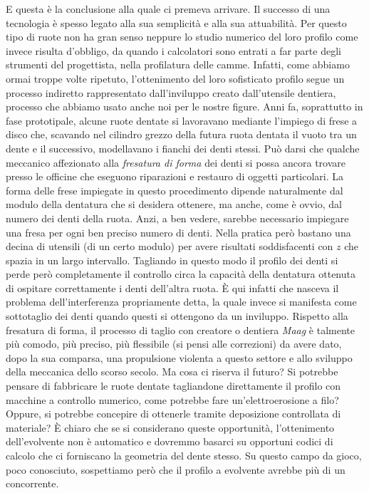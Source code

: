\noindent E questa \`e
la conclusione alla quale ci premeva arrivare. Il successo di una 
tecnologia \`e spesso legato alla sua semplicit\`a e
alla sua attuabilit\`a.
Per questo tipo di  ruote non ha gran senso neppure lo studio numerico
del loro profilo come invece risulta d'obbligo,
da quando i calcolatori sono entrati a far parte degli strumenti
del progettista,  nella profilatura 
delle camme. Infatti, come abbiamo ormai troppe volte ripetuto,
l'ottenimento del loro sofisticato profilo
segue un processo
indiretto rappresentato dall'inviluppo creato dall'utensile dentiera,
processo che abbiamo usato anche noi per le nostre figure.
Anni fa, soprattutto
in fase prototipale, alcune
ruote dentate si lavoravano mediante l'impiego di frese a disco
che, scavando nel cilindro grezzo della futura ruota dentata
il vuoto tra un dente e il successivo,
modellavano i fianchi dei denti stessi.
Pu\`o darsi che qualche meccanico affezionato
alla {\em fresatura di forma}
dei denti si possa ancora trovare presso
le officine che eseguono riparazioni e restauro di oggetti particolari.
La forma delle frese impiegate in questo procedimento
dipende naturalmente dal modulo della dentatura che si desidera ottenere,
ma anche, come \`e ovvio, dal numero dei denti della ruota.
Anzi, a ben vedere, sarebbe necessario impiegare 
una fresa per ogni ben preciso numero di denti.
Nella pratica per\`o bastano una decina di
utensili (di un certo modulo) per avere risultati soddisfacenti con
$z$ che spazia in un largo intervallo. Tagliando in
questo modo  il profilo dei denti
si perde per\`o completamente il controllo circa la 
capacit\`a della dentatura ottenuta di ospitare correttamente i denti
dell'altra ruota. \`E qui infatti che nasceva il problema dell'interferenza
propriamente detta,
la quale invece si manifesta come sottotaglio
dei denti quando questi si ottengono da un inviluppo. Rispetto alla
fresatura di forma,
il processo di taglio con creatore o dentiera {\em Maag} \`e
talmente pi\`u comodo, pi\`u preciso, pi\`u flessibile (si pensi
alle correzioni) da avere dato, dopo la sua comparsa,
una propulsione violenta a questo settore e allo sviluppo
della meccanica dello scorso secolo. Ma
cosa ci riserva il futuro? Si potrebbe pensare di fabbricare le ruote
dentate tagliandone direttamente il profilo con macchine
a controllo numerico, come potrebbe fare un'elettroerosione a filo?
Oppure, si potrebbe concepire di ottenerle tramite deposizione controllata
di materiale?  \`E chiaro che se si considerano queste opportunit\`a,
l'ottenimento dell'evolvente non \`e automatico e dovremmo
basarci su opportuni codici di calcolo che ci forniscano la geometria del
dente stesso. Su questo campo da gioco, poco conosciuto,
sospettiamo per\`o che il profilo a evolvente
avrebbe pi\`u di un concorrente.

\endinput
